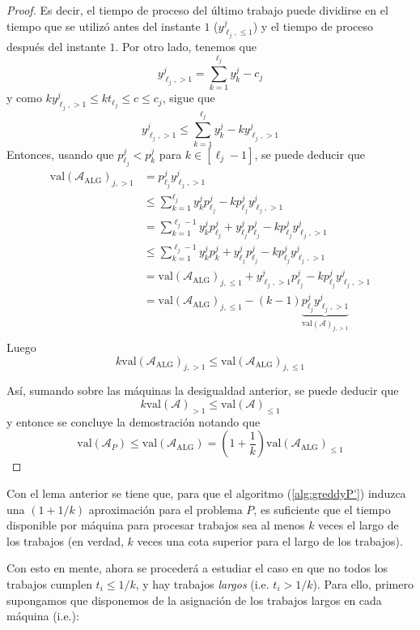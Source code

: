 \documentclass[10pt]{article}
\newcommand{\val}[1]{\text{val}(#1)}
\theoremstyle{plain}
\theoremstyle{definition}
\begin{document}
\begin{proof}
Es decir, el tiempo de proceso del último trabajo  puede dividirse en el tiempo que se utilizó antes del instante $1$ ($y^j_{\ell_j, \leq 1}$) y el tiempo de proceso después del instante $1$.  Por otro lado, tenemos que
$$
y^j_{\ell_j, > 1} = \sum_{k=1}^{\ell_j} y^j_k-c_j
$$
y como $k y^j_{\ell_j, > 1}\leq k t_{\ell_j}\leq c \leq c_j$, sigue que
$$
y^j_{\ell_j, > 1} \leq \sum_{k=1}^{\ell_j}y^j_k -ky^j_{\ell_j, > 1}
$$
Entonces, usando que $p^j_{\ell_j}<p^j_k$ para $k \in [\ell_j - 1]$, se puede deducir que
\begin{align*}
\val{\mathcal{A}_{\text{ALG}}}_{j,>1} &= p^j_{\ell_j}y^j_{\ell_j, > 1}\\
									  &\leq \sum_{k=1}^{\ell_j} y^j_kp^j_{\ell_j} - kp^j_{\ell_j}y^j_{\ell_j, > 1}\\
									  &= \sum_{k=1}^{\ell_j-1} y^j_kp^j_{\ell_j} + y^j_{\ell_j}p^j_{\ell_j}-kp^j_{\ell_j}y^j_{\ell_j, >1}\\
									  &\leq \sum_{k=1}^{\ell_j-1}y^j_k p_k^j + y^j_{\ell_j}p^j_{\ell_j}-kp^j_{\ell_j}y^j_{\ell_j, >1}\\
									  &=\val{\mathcal{A}_{\text{ALG}}}_{j,\leq 1} + y^j_{\ell_j,>1}p^j_{\ell_j}-kp^j_{\ell_j}y^j_{\ell_j,>1}\\
									  &=\val{\mathcal{A}_{\text{ALG}}}_{j,\leq 1}-(k-1)\underbrace{p^j_{\ell_j}y^j_{\ell_j,>1}}_{\val{\mathcal{A}}_{j,>1}}\\
\end{align*}
Luego
$$
k \val{\mathcal{A}_{\text{ALG}}}_{j,>1} \leq \val{\mathcal{A}_{\text{ALG}}}_{j,\leq 1}
$$

Así, sumando sobre las máquinas la desigualdad anterior, se puede deducir que 
$$
k \val{\mathcal{A}}_{>1} \leq \val{\mathcal{A}}_{\leq 1}
$$
y entonce se concluye la demostración notando que
$$
\val{\mathcal{A}_P} \leq \val{\mathcal{A}_{\text{ALG}}} = \left(1+ \frac{1}{k}\right)\val{\mathcal{A}_{\text{ALG}}}_{\leq 1}
$$
\end{proof} 
Con el lema anterior se tiene que, para que el algoritmo (\ref{alg:greddyP'}) induzca una $(1+1/k)$ aproximación para  el problema $P$, es suficiente que el tiempo disponible por máquina para procesar trabajos sea al menos $k$ veces el largo de los trabajos (en verdad, $k$ veces una cota superior para el largo de los trabajos).

Con esto en mente, ahora se procederá a estudiar el caso en que no todos los trabajos cumplen $t_i \leq 1/k$, y hay trabajos \textit{largos} (i.e. $t_i > 1/k$). Para ello, primero supongamos que disponemos de la asignación de los trabajos largos en cada máquina (i.e.):
\end{document}
